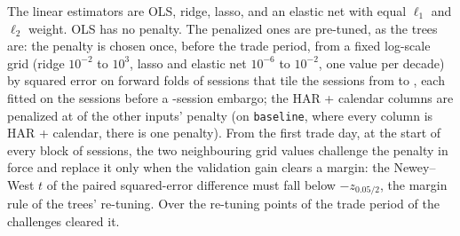 The linear estimators are OLS, ridge, lasso, and an elastic net with equal
$\ell_1$ and $\ell_2$ weight. OLS has no penalty. The penalized ones are pre-tuned, as the %
trees are: the penalty is chosen once, before the trade period, from a fixed log-scale
grid (ridge $10^{-2}$ to $10^{3}$, lasso and elastic net $10^{-6}$ to $10^{-2}$, one value
per decade) by squared error on \cmPtFolds{} forward folds of \cmPtFoldLen{} sessions that
tile the sessions from \cmPtValFirst{} to \cmPtValLast, each fitted on the \cmPtFitWin{}
sessions before a \cmPtEmbargo-session embargo; the HAR + calendar columns are penalized at
\cmPtRatio{} of the other inputs' penalty (on \texttt{baseline}, where every column is HAR +
calendar, there is one penalty). From the first trade day, at the start of every block of
\cmPtBlock{} sessions, the two neighbouring grid values challenge the penalty in force and
replace it only when the validation gain clears a margin: the Newey--West $t$ of the paired
squared-error difference must fall below $-z_{0.05/2}$, the margin rule of the trees'
re-tuning. Over the \cmPtRetuneN{} re-tuning points of the trade period \cmPtFiredTotal{} of
the \cmPtFiredOf{} challenges cleared it.
